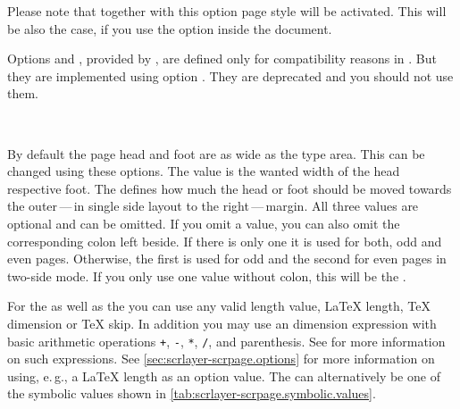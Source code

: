 Please note that together with this option page style
 will be activated. This will be also the case, if you
use the option inside the document.

%
%
Options  and , provided by
, are defined only for compatibility reasons in
. But they are implemented using option
. They are deprecated and you should not use them.%
%
%
%
%
%


\begin{Declaration}
  \\
\end{Declaration}
%
%
By default the page head and foot are as
wide as the type area. This can be changed using these \KOMAScript{}
options. The value  is the wanted width of the head respective
foot. The  defines how much the head or foot should be moved
towards the outer\,---\,in single side layout to the right\,---\,margin. All
three values are optional and can
be omitted. If you omit a value, you can also omit the corresponding colon
left beside. If there is only one  it is used for both, odd and
even pages. Otherwise, the first  is used for odd and the second
 for even pages in two-side mode. If you only use one value
without colon, this will be the .

For the  as well as the  you can use any valid
length value, \LaTeX{} length, \TeX{} dimension or \TeX{} skip. In addition
you may use an \eTeX{} dimension expression with basic arithmetic operations
\texttt{+}, \texttt{-}, \texttt{*}, \texttt{/}, and parenthesis. See
\cite[section~3.5]{manual:eTeX} for more information on such expressions.  See
\autoref{sec:scrlayer-scrpage.options} for more information on using,
e.\,g., a \LaTeX{} length as an option value. The  can
alternatively be one of the symbolic values shown in
\autoref{tab:scrlayer-scrpage.symbolic.values}.

